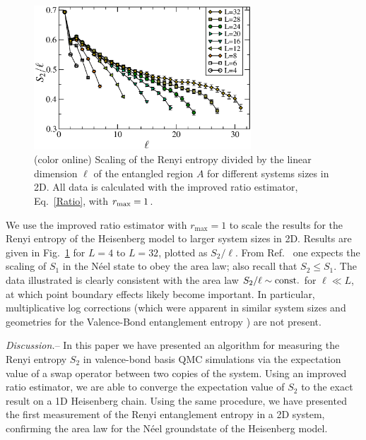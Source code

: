 \documentclass[prl,aps,twocolumn,floatfix,amsmath,amssymb,superscriptaddress,tightenlines]{revtex4}
\begin{document}
\begin{figure} {
\includegraphics[width=3.2in]{fig4.eps} \caption{(color online) 
\label{fig4}
Scaling of the Renyi entropy divided by the linear dimension $\ell$ of the entangled region $A$ for different systems sizes
in 2D.  All data is calculated with the improved ratio estimator, Eq.~\eqref{Ratio}, with $r_{\rm max}=1$.  
}
} \end{figure}

We use the improved ratio estimator with $r_{\max}=1$ to scale the results for the Renyi entropy of the Heisenberg model to larger system sizes in 2D.  Results are given in Fig.~\ref{fig4} for $L=4$ to $L=32$, plotted as $S_2/\ell$.  From  Ref.~\cite{Ann}
one expects the scaling of $S_1$ in the N\'eel state to obey the area law; also recall that $S_2 \leq S_1$.  
The data illustrated is clearly consistent with the area law $S_2/\ell
\sim {\rm const.}$ for $\ell \ll L$, at which point boundary 
effects likely become important.  In particular, multiplicative log corrections (which were apparent in similar system sizes and geometries for the Valence-Bond entanglement entropy
\cite{Alet,Chh}) are not present.

{\it Discussion.}-- 
In this paper we have presented an algorithm for measuring the Renyi entropy $S_2$ in valence-bond basis QMC simulations via
the expectation value of a swap operator between two copies of the system.
Using an improved ratio estimator, we are able to converge the expectation value of $S_2$ to the exact
result on a 1D Heisenberg chain.
Using the same procedure, we have presented the first measurement of the Renyi entanglement entropy in a 2D system, confirming the area law for the N\'eel groundstate of the Heisenberg model.
\end{document}

